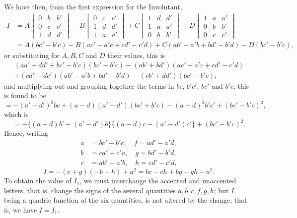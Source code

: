 \documentclass[11pt,a4paper]{article}
\theoremstyle{plain}
\begin{document}
We have then, from the first expression for the Involutant,
\begin{align*}
I &= A \begin{vmatrix} 0 & b & b' \\ 0 & c & c' \\ 1 & d & d' \end{vmatrix}
- B \begin{vmatrix} 0 & c & c' \\ 1 & d & d' \\ 1 & a & a' \end{vmatrix}
+ C \begin{vmatrix} 1 & d & d' \\ 1 & a & a' \\ 0 & b & b' \end{vmatrix}
- D \begin{vmatrix} 1 & a & a' \\ 0 & b & b' \\ 0 & c & c' \end{vmatrix} \\
&= A(bc' - b'c) - B(ac' - a'c + cd' - c'd) + C(ab' - a'b + bd' - b'd) - D(bc' - b'c),
\end{align*}
or substituting for $A, B, C$ and $D$ their values, this is
\begin{multline*}
(aa' - dd' + bc' - b'c)(bc' - b'c) - (ab' + bd')(ac' - a'c + cd' - c'd) \\
+ (ca' + dc')(ab' - a'b + bd' - b'd) - (cb' + dd')(bc' - b'c);
\end{multline*}
and multiplying out and grouping together the terms in $bc$, $b'c'$, $bc'$ and $b'c$, this is found to be
$$
= -(a' - d')^2 bc + (a - d)(a' - d')(bc' + b'c) - (a - d)^2 b'c' + (bc' - b'c)^2,
$$
which is
$$
= -\{(a - d)b' - (a' - d')b\}\{(a - d)c - (a' - d')c'\} + (bc' - b'c)^2.
$$
Hence, writing
\begin{align*}
a &= bc' - b'c, \quad f = ad' - a'd, \\
b &= ca' - c'a, \quad g = bd' - b'd, \\
c &= ab' - a'b, \quad h = cd' - c'd,
\end{align*}
$$
I = -(c + g)(-b + h) + a^2 = bc - ch + bg - gh + a^2.
$$
To obtain the value of $I_1$, we must interchange the accented and unaccented letters, that is, change the signs of the several quantities $a, b, c, f, g, h$; but $I$, being a quadric function of the six quantities, is not altered by the change; that is, we have $I = I_1$.

\newpage
\end{document}
